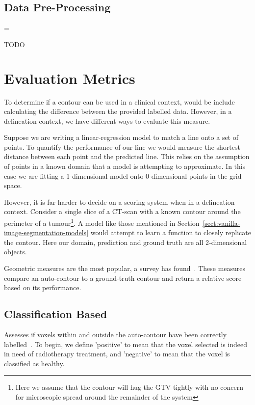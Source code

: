 \documentclass[11pt,twoside]{report}
\newenvironment{warning}
  {\par\begin{mdframed}[linewidth=1pt,linecolor=black]%
    \begin{list}{}{\leftmargin=1cm
                   \labelwidth=\leftmargin}\item[\Large\ding{43}]}
  {\end{list}\end{mdframed}\par}
\begin{document}
\section{Data Pre-Processing}\label{sect:data-cleaning}

\begin{warning}
  TODO
\end{warning}

\chapter{Evaluation Metrics}\label{chapter:evaluation-metrics}

To determine if a contour can be used in a clinical context, would be include calculating the difference between the provided labelled data. However, in a delineation context, we have different ways to evaluate this measure.

Suppose we are writing a linear-regression model to match a line onto a set of points. To quantify the performance of our line we would measure the shortest distance between each point and the predicted line. This relies on the assumption of points in a known domain that a model is attempting to approximate. In this case we are fitting a 1-dimensional model onto 0-dimensional points in the grid space.

However, it is far harder to decide on a scoring system when in a delineation context. Consider a single slice of a CT-scan with a known contour around the perimeter of a tumour\footnote{Here we assume that the contour will hug the GTV tightly with no concern for microscopic spread around the remainder of the system}. A model like those mentioned in Section~\ref{sect:vanilla-image-segmentation-models} would attempt to learn a function to closely replicate the contour. Here our domain, prediction and ground truth are all 2-dimensional objects.

Geometric measures are the most popular, a survey has found~\cite{review-metrics}. These measures compare an auto-contour to a ground-truth contour and return a relative score based on its performance.

\section{Classification Based}\label{sect:classification-based}

Assesses if voxels within and outside the auto-contour have been correctly labelled~\cite{review-metrics}. To begin, we define 'positive' to mean that the voxel selected is indeed in need of radiotherapy treatment, and 'negative' to mean that the voxel is classified as healthy.
\end{document}
